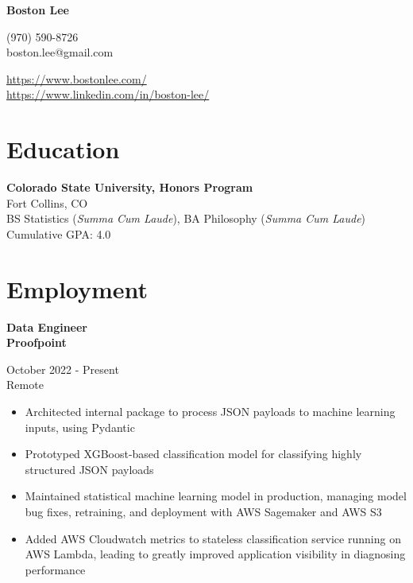 \documentclass{article}
\newcommand{\resumeSubheading}[5]{
\noindent\begin{minipage}{0.5\textwidth}
	\begin{flushleft}
	\textbf{#1}\\
	\textbf{#2}\\
	\end{flushleft}
\end{minipage}%
\hfill
\begin{minipage}{0.5\textwidth}
	\begin{flushright}
	#3\\
	#4\\
	\end{flushright}
\end{minipage}%
\newline
#5
}
\begin{document}
\begin{flushleft}
\LARGE \textbf{Boston Lee} \\
\end{flushleft}

\noindent\begin{minipage}{0.5\textwidth}
	\begin{flushleft}
	(970) 590-8726 \\
	boston.lee@gmail.com \\
	\end{flushleft}
\end{minipage}%
\hfill
\begin{minipage}{0.5\textwidth}
	\begin{flushright}
	\url{https://www.bostonlee.com/} \\
	\url{https://www.linkedin.com/in/boston-lee/} \\
	\end{flushright}
\end{minipage}%

\section{Education}

\begin{flushleft}
\textbf{Colorado State University, Honors Program}\\
Fort Collins, CO\\
BS Statistics (\textit{Summa Cum Laude}), BA Philosophy (\textit{Summa Cum Laude})\\
Cumulative GPA: 4.0
\end{flushleft}

\section{Employment}


\resumeSubheading{Data Engineer}{Proofpoint}{October 2022 - Present}{Remote}{
	\begin{itemize}

		\item Architected internal package to process JSON payloads to
			machine learning inputs, using Pydantic

		\item Prototyped XGBoost-based classification model for
			classifying highly structured JSON payloads

		\item Maintained statistical machine learning model in
			production, managing model bug fixes, retraining, and
			deployment with AWS Sagemaker and AWS S3

		\item Added AWS Cloudwatch metrics to stateless classification
			service running on AWS Lambda, leading to greatly
			improved application visibility in diagnosing
			performance

	\end{itemize}
}
\end{document}
